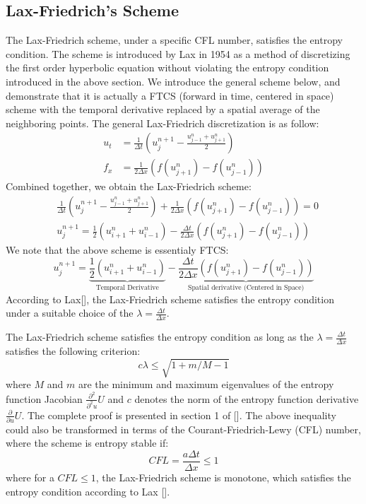 \documentclass[a4paper]{article}
\numberwithin{equation}{section}
\begin{document}
\subsection{Lax-Friedrich's Scheme}
The Lax-Friedrich scheme, under a specific CFL number, satisfies the entropy condition. The scheme is introduced by Lax in 1954 as a method of discretizing the first order hyperbolic equation without violating the entropy condition introduced in the above section. We introduce the general scheme below, and demonstrate that it is actually a FTCS (forward in time, centered in space) scheme with the temporal derivative replaced by a spatial average of the neighboring points. 
The general Lax-Friedrich discretization is as follow:
\begin{equation}
    \begin{split}
        u_t &= \frac{1}{\Delta t}\left( u^{n+1}_j - \frac{u^n_{j-1} + u^n_{j+1}}{2} \right)  \\
        f_x &= \frac{1}{2\Delta x}\left(f(u^n_{j+1}) - f(u^n_{j-1})\right)
    \end{split}
\end{equation}
Combined together, we obtain the Lax-Friedrich scheme:
\begin{equation}
    \begin{split}
        &\frac{1}{\Delta t}\left( u^{n+1}_j - \frac{u^n_{j-1} + u^n_{j+1}}{2} \right) + \frac{1}{2\Delta x}\left(f(u^n_{j+1}) - f(u^n_{j-1})\right) = 0 \\
        &u_j^{n+1} = \frac{1}{2}(u_{i+1}^n + u_{i-1}^n) - \frac{\Delta t}{2\Delta x}\left(f(u^n_{j+1}) - f(u^n_{j-1})\right)
    \end{split}
\end{equation}
We note that the above scheme is essentialy FTCS:
\begin{equation}
    u_j^{n+1} = \underbrace{\frac{1}{2}(u_{i+1}^n + u_{i-1}^n)}_{\text{Temporal Derivative}} - \underbrace{\frac{\Delta t}{2\Delta x}\left(f(u^n_{j+1}) - f(u^n_{j-1})\right)}_{\text{Spatial derivative (Centered in Space)}}
\end{equation}
According to Lax[], the Lax-Friedrich scheme satisfies the entropy condition under a suitable choice of the $\lambda = \frac{\Delta t}{\Delta x}$.

The Lax-Friedrich scheme satisfies the entropy condition as long as the $\lambda = \frac{\Delta t}{\Delta x}$ satisfies the following criterion:
\begin{equation}
    c\lambda \leq \sqrt{1+m/M-1}
\end{equation}
where $M$ and $m$ are the minimum and maximum eigenvalues of the entropy function Jacobian $\frac{\partial^2}{\partial^2 u}U$ and $c$ denotes the norm of the entropy function derivative $\frac{\partial}{\partial u} U$. The complete proof is presented in section 1 of []. The above inequality could also be transformed in terms of the Courant-Friedrich-Lewy (CFL) number, where the scheme is entropy stable if:
\begin{equation}
    CFL = \frac{a \Delta t}{\Delta x} \leq 1
\end{equation}
where for a $CFL \leq 1$, the Lax-Friedrich scheme is monotone, which satisfies the entropy condition according to Lax [].
\end{document}
